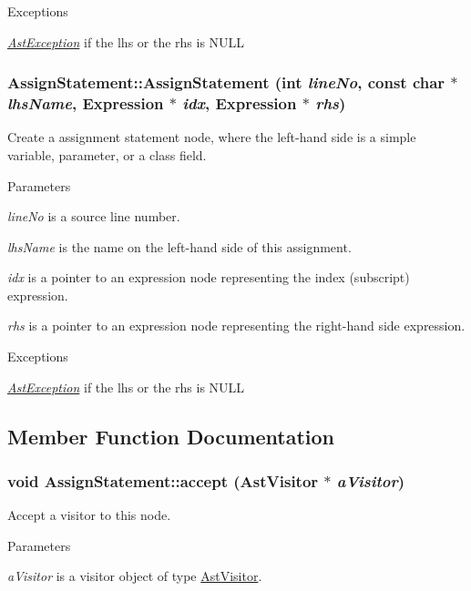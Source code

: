 \begin{DoxyExceptions}{Exceptions}
\item[{\em \hyperlink{classAstException}{AstException}}]if the lhs or the rhs is NULL \end{DoxyExceptions}
\hypertarget{classAssignStatement_a54299cdd3f930c738a74bbff01200d9d}{
\subsubsection[{AssignStatement}]{\setlength{\rightskip}{0pt plus 5cm}AssignStatement::AssignStatement (int {\em lineNo}, \/  const char $\ast$ {\em lhsName}, \/  {\bf Expression} $\ast$ {\em idx}, \/  {\bf Expression} $\ast$ {\em rhs})}}
\label{classAssignStatement_a54299cdd3f930c738a74bbff01200d9d}
Create a assignment statement node, where the left-\/hand side is a simple variable, parameter, or a class field. 
\begin{DoxyParams}{Parameters}
\item[{\em lineNo}]is a source line number. \item[{\em lhsName}]is the name on the left-\/hand side of this assignment. \item[{\em idx}]is a pointer to an expression node representing the index (subscript) expression. \item[{\em rhs}]is a pointer to an expression node representing the right-\/hand side expression. \end{DoxyParams}

\begin{DoxyExceptions}{Exceptions}
\item[{\em \hyperlink{classAstException}{AstException}}]if the lhs or the rhs is NULL \end{DoxyExceptions}


\subsection{Member Function Documentation}
\hypertarget{classAssignStatement_a178a2773781301e16eebfd3d420dc98d}{
\subsubsection[{accept}]{\setlength{\rightskip}{0pt plus 5cm}void AssignStatement::accept ({\bf AstVisitor} $\ast$ {\em aVisitor})}}
\label{classAssignStatement_a178a2773781301e16eebfd3d420dc98d}
Accept a visitor to this node. 
\begin{DoxyParams}{Parameters}
\item[{\em aVisitor}]is a visitor object of type \hyperlink{classAstVisitor}{AstVisitor}. \end{DoxyParams}


